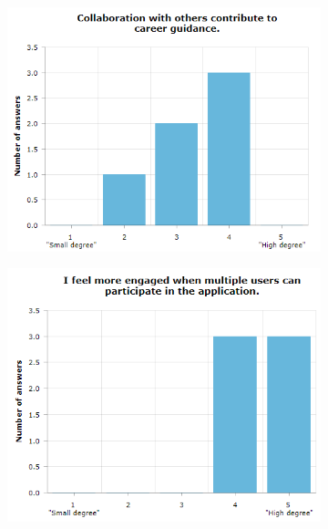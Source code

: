 \begin{figure}[]
  \begin{subfigure}[b]{0.5\textwidth}
    \captionsetup{width=0.8\linewidth}
    \includegraphics[width=1\textwidth]{fig/phase_2/charts/collabIncreaseCareer.PNG}
    \caption{}
    \label{fig:phase2_collabIncreaseCareer}
  \end{subfigure}
  \hfill%
  \begin{subfigure}[b]{0.5\textwidth}
    \captionsetup{width=0.8\linewidth}
    \includegraphics[width=1\textwidth]{fig/phase_2/charts/collabMoreEngaged.PNG}
    \caption{}
    \label{fig:phase2_collabMoreEngaged}

\end{subfigure}
\end{figure}
